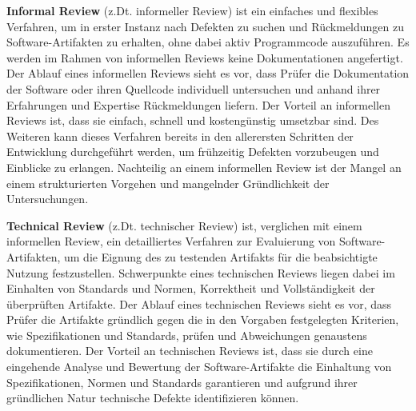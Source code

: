 \textbf{Informal Review} (z.Dt. informeller Review) ist ein einfaches und flexibles Verfahren, um in erster Instanz nach Defekten zu suchen und Rückmeldungen zu Software-Artifakten zu erhalten, ohne dabei aktiv Programmcode auszuführen. 
Es werden im Rahmen von informellen Reviews keine Dokumentationen angefertigt.
Der Ablauf eines informellen Reviews sieht es vor, dass Prüfer die Dokumentation der Software oder ihren Quellcode individuell untersuchen und anhand ihrer Erfahrungen und Expertise Rückmeldungen liefern.
Der Vorteil an informellen Reviews ist, dass sie einfach, schnell und kostengünstig umsetzbar sind.
Des Weiteren kann dieses Verfahren bereits in den allerersten Schritten der Entwicklung durchgeführt werden, um frühzeitig Defekten vorzubeugen und Einblicke zu erlangen.
Nachteilig an einem informellen Review ist der Mangel an einem strukturierten Vorgehen und mangelnder Gründlichkeit der Untersuchungen.

\textbf{Technical Review} (z.Dt. technischer Review) ist, verglichen mit einem informellen Review, ein detailliertes Verfahren zur Evaluierung von Software-Artifakten, um die Eignung des zu testenden Artifakts für die beabsichtigte Nutzung festzustellen.
Schwerpunkte eines technischen Reviews liegen dabei im Einhalten von Standards und Normen, Korrektheit und Vollständigkeit der überprüften Artifakte.
Der Ablauf eines technischen Reviews sieht es vor, dass Prüfer die Artifakte gründlich gegen die in den Vorgaben festgelegten Kriterien, wie Spezifikationen und Standards, prüfen und Abweichungen genaustens dokumentieren.
Der Vorteil an technischen Reviews ist, dass sie durch eine eingehende Analyse und Bewertung der Software-Artifakte die Einhaltung von Spezifikationen, Normen und Standards garantieren und aufgrund ihrer gründlichen Natur technische Defekte identifizieren können.

